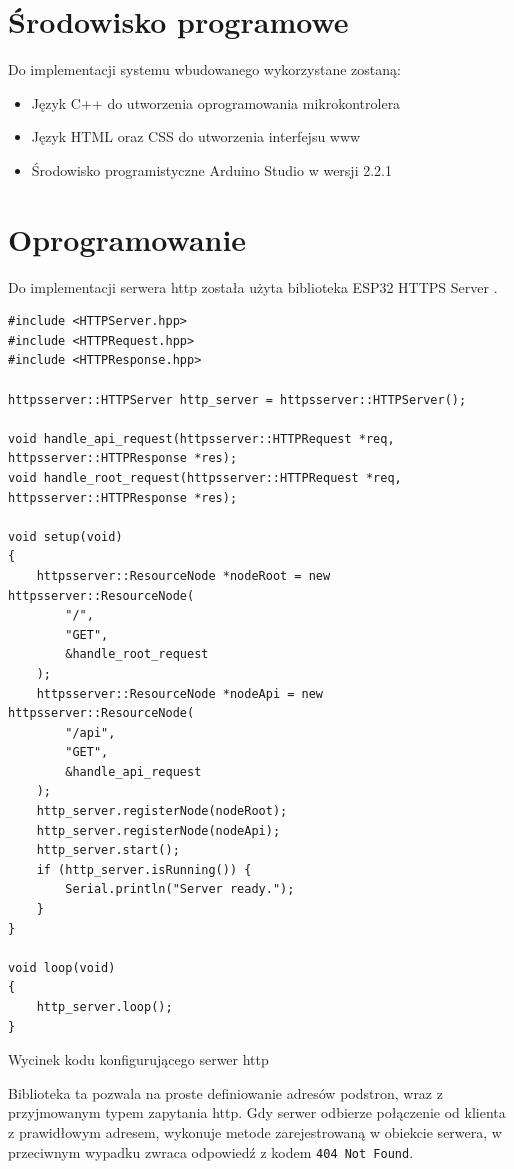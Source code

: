 \documentclass[12pt,a4paper]{article}
\begin{document}
\section{Środowisko programowe}
Do implementacji systemu wbudowanego wykorzystane zostaną:
\begin{itemize}
    \item Język C++ do utworzenia oprogramowania mikrokontrolera
    \item Język HTML oraz CSS do utworzenia interfejsu www
    \item Środowisko programistyczne Arduino Studio w wersji 2.2.1
\end{itemize}

\section{Oprogramowanie}

Do implementacji serwera http została użyta biblioteka ESP32 HTTPS Server \cite{esp32-https-server-library}. 

\begin{code}[H]
\begin{verbatim}
#include <HTTPServer.hpp>
#include <HTTPRequest.hpp>
#include <HTTPResponse.hpp>

httpsserver::HTTPServer http_server = httpsserver::HTTPServer();

void handle_api_request(httpsserver::HTTPRequest *req, httpsserver::HTTPResponse *res);
void handle_root_request(httpsserver::HTTPRequest *req, httpsserver::HTTPResponse *res);

void setup(void)
{
    httpsserver::ResourceNode *nodeRoot = new httpsserver::ResourceNode(
        "/", 
        "GET", 
        &handle_root_request
    );
    httpsserver::ResourceNode *nodeApi = new httpsserver::ResourceNode(
        "/api", 
        "GET", 
        &handle_api_request
    );
    http_server.registerNode(nodeRoot);
    http_server.registerNode(nodeApi);
    http_server.start();
    if (http_server.isRunning()) {
        Serial.println("Server ready.");
    }
}

void loop(void)
{
    http_server.loop();
}
\end{verbatim}
\caption{Wycinek kodu konfigurującego serwer http}
\label{http-server-code-parts}
\end{code}

Biblioteka ta pozwala na proste definiowanie adresów podstron, wraz z przyjmowanym typem zapytania http. Gdy serwer odbierze połączenie od klienta z prawidłowym adresem, wykonuje metode zarejestrowaną w obiekcie serwera, w przeciwnym wypadku zwraca odpowiedź z kodem  \texttt{404 Not Found}.
\end{document}

